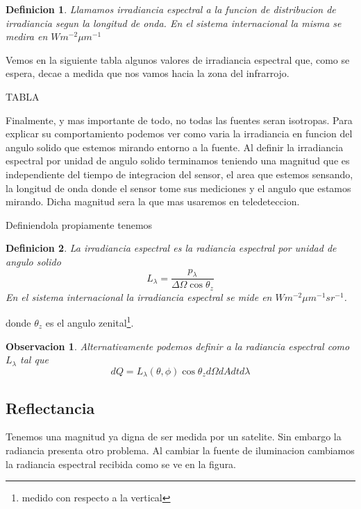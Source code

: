 \documentclass[a4paper,12pt]{article}
\newtheorem{dex}{Definicion}[section]
\newtheorem*{obs}{Observacion}
\begin{document}
\begin{dex}
  Llamamos irradiancia espectral a la funcion de distribucion de irradiancia
  segun la longitud de onda. En el sistema internacional la misma se medira en
  $W m^{-2} \mu m^{-1}$
\end{dex}

Vemos en la siguiente tabla algunos valores de irradiancia espectral que, como
se espera, decae a medida que nos vamos hacia la zona del infrarrojo.

TABLA

Finalmente, y mas importante de todo, no todas las fuentes seran isotropas. Para
explicar su comportamiento podemos ver como varia la irradiancia en funcion del
angulo solido que estemos mirando entorno a la fuente. Al definir la irradiancia
espectral por unidad de angulo solido terminamos teniendo una magnitud que es
independiente del tiempo de integracion del sensor, el area que estemos
sensando, la longitud de onda donde el sensor tome sus mediciones  y el angulo
que estamos mirando. Dicha magnitud sera la que mas usaremos en teledeteccion.

Definiendola propiamente tenemos

\begin{dex}
  La irradiancia espectral es la radiancia espectral por unidad de angulo solido
  \begin{equation}
    L_\lambda = \frac{p_\lambda}{\Delta \Omega \cos \theta_z}
  \end{equation}
  En el sistema internacional la irradiancia espectral se mide en $W m^{-2} \mu
  m^{-1} sr^{-1}$.
\end{dex}

donde $\theta_z$ es el angulo zenital\footnote{medido con respecto a la
vertical}. 

\begin{obs}
  Alternativamente podemos definir a la radiancia espectral como $L_\lambda$ tal
  que
  \begin{equation}
    dQ = L_\lambda(\theta,\phi) \cos \theta_z d\Omega dA dt d\lambda
  \end{equation}
\end{obs}

\subsection{Reflectancia}
Tenemos una magnitud ya digna de ser medida por un satelite. Sin embargo la
radiancia presenta otro problema. Al cambiar la fuente de iluminacion cambiamos
la radiancia espectral recibida como se ve en la figura.
\end{document}
